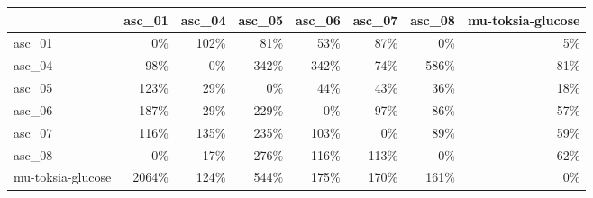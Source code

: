 \begin{tabular}{lrrrrrrr}
\toprule
 & asc_01 & asc_04 & asc_05 & asc_06 & asc_07 & asc_08 & mu-toksia-glucose \\
\midrule
asc_01 & 0\% & 102\% & 81\% & 53\% & 87\% & 0\% & 5\% \\
asc_04 & 98\% & 0\% & 342\% & 342\% & 74\% & 586\% & 81\% \\
asc_05 & 123\% & 29\% & 0\% & 44\% & 43\% & 36\% & 18\% \\
asc_06 & 187\% & 29\% & 229\% & 0\% & 97\% & 86\% & 57\% \\
asc_07 & 116\% & 135\% & 235\% & 103\% & 0\% & 89\% & 59\% \\
asc_08 & 0\% & 17\% & 276\% & 116\% & 113\% & 0\% & 62\% \\
mu-toksia-glucose & 2064\% & 124\% & 544\% & 175\% & 170\% & 161\% & 0\% \\
\bottomrule
\end{tabular}
